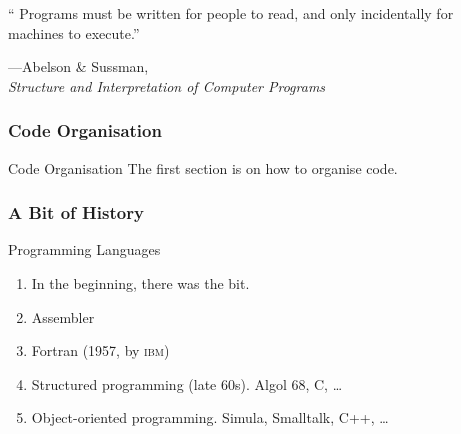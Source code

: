 \begin{frame}[fragile]

`` Programs must be written for people to read, and only incidentally for machines to execute.''
\begin{flushright}
---Abelson \& Sussman, \\\textit{Structure and Interpretation of Computer Programs}
\end{flushright}

\end{frame}



\begin{frame}[fragile]
\frametitle{Code Organisation}

\begin{block}{Code Organisation}
The first section is on how to organise code.
\end{block}
\end{frame}

\begin{frame}[fragile]
\frametitle{A Bit of History}

\begin{block}{Programming Languages}
\begin{enumerate}
\item In the beginning, there was the bit.
\item Assembler
\item Fortran (1957, by \textsc{ibm})
\item Structured programming (late 60s). Algol 68, C, \ldots
\item Object-oriented programming. Simula, Smalltalk, C++, \ldots %
\end{enumerate}
\end{block}
\end{frame}

